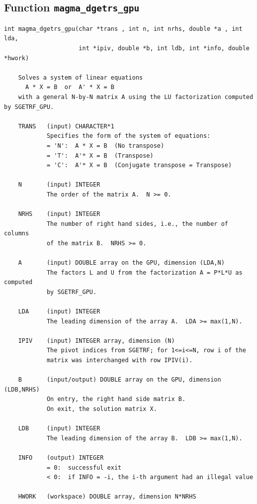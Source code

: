 \documentclass[10pt]{book}
\begin{document}
\subsection{Function {\tt {\bf magma\_dgetrs\_gpu}}}
\begin{verbatim}
int magma_dgetrs_gpu(char *trans , int n, int nrhs, double *a , int lda,
                     int *ipiv, double *b, int ldb, int *info, double *hwork)

    Solves a system of linear equations
      A * X = B  or  A' * X = B
    with a general N-by-N matrix A using the LU factorization computed by SGETRF_GPU.

    TRANS   (input) CHARACTER*1
            Specifies the form of the system of equations:
            = 'N':  A * X = B  (No transpose)
            = 'T':  A'* X = B  (Transpose)
            = 'C':  A'* X = B  (Conjugate transpose = Transpose)

    N       (input) INTEGER
            The order of the matrix A.  N >= 0.

    NRHS    (input) INTEGER
            The number of right hand sides, i.e., the number of columns
            of the matrix B.  NRHS >= 0.

    A       (input) DOUBLE array on the GPU, dimension (LDA,N)
            The factors L and U from the factorization A = P*L*U as computed
            by SGETRF_GPU.

    LDA     (input) INTEGER
            The leading dimension of the array A.  LDA >= max(1,N).

    IPIV    (input) INTEGER array, dimension (N)
            The pivot indices from SGETRF; for 1<=i<=N, row i of the
            matrix was interchanged with row IPIV(i).

    B       (input/output) DOUBLE array on the GPU, dimension (LDB,NRHS)
            On entry, the right hand side matrix B.
            On exit, the solution matrix X.

    LDB     (input) INTEGER
            The leading dimension of the array B.  LDB >= max(1,N).

    INFO    (output) INTEGER
            = 0:  successful exit
            < 0:  if INFO = -i, the i-th argument had an illegal value

    HWORK   (workspace) DOUBLE array, dimension N*NRHS
\end{verbatim}

\newpage
\end{document}
